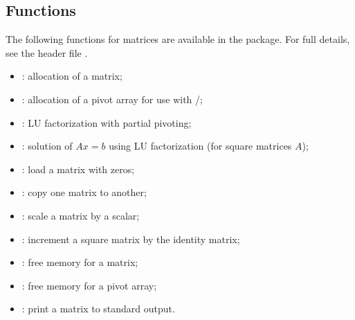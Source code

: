 \subsection{Functions}
The following functions for  matrices are available
in the {\dense} package.  For full details, see the header file .
\begin{itemize}
\item {}: allocation of a  matrix;
\item {}: allocation of a pivot array for use
  with /;
\item {}: LU factorization with partial pivoting;
\item {}: solution of $Ax = b$ using LU factorization (for square matrices $A$);
\item {}: load a matrix with zeros;
\item {}: copy one matrix to another;
\item {}: scale a matrix by a scalar;
\item {}: increment a square matrix by the identity matrix;
\item {}: free memory for a  matrix;
\item {}: free memory for a pivot array;
\item {}: print a  matrix to standard output.
\end{itemize}

